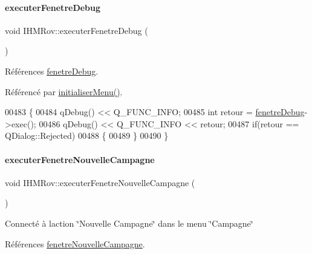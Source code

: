\paragraph{\texorpdfstring{executer\+Fenetre\+Debug}{executerFenetreDebug}}
{\footnotesize\ttfamily void I\+H\+M\+Rov\+::executer\+Fenetre\+Debug (\begin{DoxyParamCaption}{ }\end{DoxyParamCaption})\hspace{0.3cm}{\ttfamily [slot]}}



Références \hyperlink{class_i_h_m_rov_a393d23f9256a9db063dfef11d95cdc06}{fenetre\+Debug}.



Référencé par \hyperlink{class_i_h_m_rov_aebbcb2325c2d1a88a012d8408e2d6223}{initialiser\+Menu()}.


\begin{DoxyCode}
00483 \{
00484     qDebug() << Q\_FUNC\_INFO;
00485     \textcolor{keywordtype}{int} retour = \hyperlink{class_i_h_m_rov_a393d23f9256a9db063dfef11d95cdc06}{fenetreDebug}->exec();
00486     qDebug() << Q\_FUNC\_INFO << retour;
00487     \textcolor{keywordflow}{if}(retour == QDialog::Rejected)
00488     \{
00489     \}
00490 \}
\end{DoxyCode}
\mbox{\label{class_i_h_m_rov_a3169e8cd9132ece69af974648066c6c1}} 
\paragraph{\texorpdfstring{executer\+Fenetre\+Nouvelle\+Campagne}{executerFenetreNouvelleCampagne}}
{\footnotesize\ttfamily void I\+H\+M\+Rov\+::executer\+Fenetre\+Nouvelle\+Campagne (\begin{DoxyParamCaption}{ }\end{DoxyParamCaption})\hspace{0.3cm}{\ttfamily [slot]}}

Connecté à l\textquotesingle{}action \char`\"{}\+Nouvelle Campagne\char`\"{} dans le menu \char`\"{}\+Campagne\char`\"{} 

Références \hyperlink{class_i_h_m_rov_a13c12a93de7fc77c32f0108ae73cec06}{fenetre\+Nouvelle\+Campagne}.



